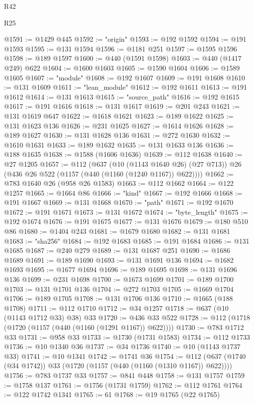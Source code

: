 \begin{lexlean}{R42}
\begin{lexlean}{R25}
\begin{coremodule}
{{{{{{{{{{{{{{{{{{{{{{{{{{{{{{{{{{{{{{{{{{{{{{{{{{{{{{{{{{{{{{{{{{{{{{{{{{{{{{{{{{{{{{{{{{{{{{{{{{{{{{{{{{{{{{{{{{{{{{{{{{{{{{{{{{{{{{{{{{{{{{{{{{{{{{{{{{{{{{{{{{{{{{{{{{{{{{{{{{{{{{{{{{{{{{{{{{{{{{{@1591 := @1429 @445
@1592 := "origin"
@1593 := @192 @1592
@1594 := @191 @1593
@1595 := @131 @1594
@1596 := @1181 @251
@1597 := @1595 @1596
@1598 := @189 @1597
@1600 := @440 (@1591 @1598)
@1603 := @440 (@1417 @249) @622
@1604 := @1600 @1603
@1605 := @1590 @1604
@1606 := @1589 @1605
@1607 := "module"
@1608 := @192 @1607
@1609 := @191 @1608
@1610 := @131 @1609
@1611 := "lean_module"
@1612 := @192 @1611
@1613 := @191 @1612
@1614 := @131 @1613
@1615 := "source_path"
@1616 := @192 @1615
@1617 := @191 @1616
@1618 := @131 @1617
@1619 := @201 @243
@1621 := @131 @1619 @647
@1622 := @1618 @1621
@1623 := @189 @1622
@1625 := @131 @1623 @136
@1626 := @231 @1625
@1627 := @1614 @1626
@1628 := @189 @1627
@1630 := @131 @1628 @136
@1631 := @272 @1630
@1632 := @1610 @1631
@1633 := @189 @1632
@1635 := @131 @1633 @136
@1636 := @188 @1635
@1638 := @1588 (@1606 @1636)
@1639 := @112 @1638
@1640 := @27 @1205
@1657 := @112
    (@637
      (@10 (@1143 @1640 @26) (@27 @713))
      @26
      (@436 @26 @522 (@1157 (@440 (@1160 (@1240 @1167)) @622))))
@1662 := @783 @1640 @26 (@958 @26 @1583)
@1663 := @112 @1662
@1664 := @122 @1257
@1665 := @1664 @86
@1666 := "kind"
@1667 := @192 @1666
@1668 := @191 @1667
@1669 := @131 @1668
@1670 := "path"
@1671 := @192 @1670
@1672 := @191 @1671
@1673 := @131 @1672
@1674 := "byte_length"
@1675 := @192 @1674
@1676 := @191 @1675
@1677 := @131 @1676
@1679 := @180 @510 @86
@1680 := @1404 @243
@1681 := @1679 @1680
@1682 := @131 @1681
@1683 := "sha256"
@1684 := @192 @1683
@1685 := @191 @1684
@1686 := @131 @1685
@1687 := @240 @279
@1689 := @131 @1687 @251
@1690 := @1686 @1689
@1691 := @189 @1690
@1693 := @131 @1691 @136
@1694 := @1682 @1693
@1695 := @1677 @1694
@1696 := @189 @1695
@1698 := @131 @1696 @136
@1699 := @231 @1698
@1700 := @1673 @1699
@1701 := @189 @1700
@1703 := @131 @1701 @136
@1704 := @272 @1703
@1705 := @1669 @1704
@1706 := @189 @1705
@1708 := @131 @1706 @136
@1710 := @1665 (@188 @1708)
@1711 := @112 @1710
@1712 := @34 @1257
@1718 := @637 (@10 (@1143 @1712 @33) @38) @33
@1720 := @436 @33 @522
@1728 := @112 (@1718 (@1720 (@1157 (@440 (@1160 (@1291 @1167)) @622))))
@1730 := @783 @1712 @33
@1731 := @958 @33
@1733 := @1730 (@1731 @1583)
@1734 := @112 @1733
@1736 := @10 @1340 @36
@1737 := @34 @1736
@1740 := @10 (@1143 @1737 @33)
@1741 := @10 @1341
@1742 := @1741 @36
@1754 := @112 (@637 (@1740 (@34 @1742)) @33 (@1720 (@1157 (@440 (@1160 (@1310 @1167)) @622))))
@1756 := @783 @1737 @33
@1757 := @841 @448
@1758 := @131 @1757
@1759 := @1758 @137
@1761 := @1756 (@1731 @1759)
@1762 := @112 @1761
@1764 := @122 @1742 @1341
@1765 := 61
@1768 := @19 @1765 (@22 @1765)
}}}}}}}}}}}}}}}}}}}}}}}}}}}}}}}}}}}}}}}}}}}}}}}}}}}}}}}}}}}}}}}}}}}}}}}}}}}}}}}}}}}}}}}}}}}}}}}}}}}}}}}}}}}}}}}}}}}}}}}}}}}}}}}}}}}}}}}}}}}}}}}}}}}}}}}}}}}}}}}}}}}}}}}}}}}}}}}}}}}}}}}}}}}}}}}}}}}}}}}
\end{coremodule}
\end{lexlean}
\end{lexlean}
